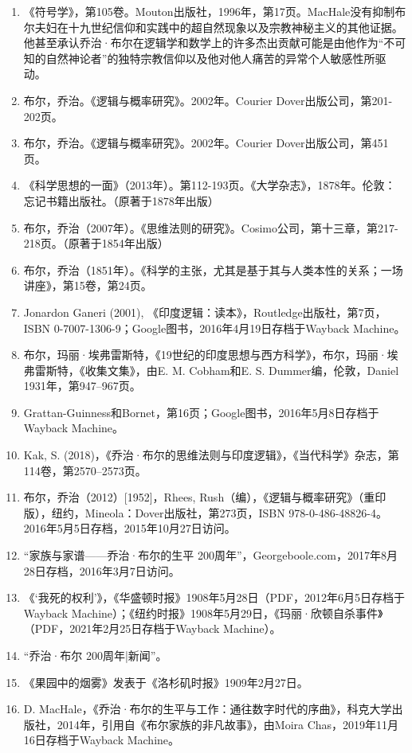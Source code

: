 \begin{enumerate}
\item 《符号学》，第105卷。Mouton出版社，1996年，第17页。MacHale没有抑制布尔夫妇在十九世纪信仰和实践中的超自然现象以及宗教神秘主义的其他证据。他甚至承认乔治·布尔在逻辑学和数学上的许多杰出贡献可能是由他作为“不可知的自然神论者”的独特宗教信仰以及他对他人痛苦的异常个人敏感性所驱动。
\item 布尔，乔治。《逻辑与概率研究》。2002年。Courier Dover出版公司，第201-202页。
\item 布尔，乔治。《逻辑与概率研究》。2002年。Courier Dover出版公司，第451页。
\item 《科学思想的一面》（2013年）。第112-193页。《大学杂志》，1878年。伦敦：忘记书籍出版社。（原著于1878年出版）
\item 布尔，乔治（2007年）。《思维法则的研究》。Cosimo公司，第十三章，第217-218页。（原著于1854年出版）
\item 布尔，乔治（1851年）。《科学的主张，尤其是基于其与人类本性的关系；一场讲座》，第15卷，第24页。
\item Jonardon Ganeri (2001), 《印度逻辑：读本》，Routledge出版社，第7页，ISBN 0-7007-1306-9；Google图书，2016年4月19日存档于Wayback Machine。
\item 布尔，玛丽·埃弗雷斯特，《19世纪的印度思想与西方科学》，布尔，玛丽·埃弗雷斯特，《收集文集》，由E. M. Cobham和E. S. Dummer编，伦敦，Daniel 1931年，第947–967页。
\item Grattan-Guinness和Bornet，第16页；Google图书，2016年5月8日存档于Wayback Machine。
\item Kak, S. (2018)，《乔治·布尔的思维法则与印度逻辑》，《当代科学》杂志，第114卷，第2570–2573页。
\item 布尔，乔治（2012）[1952]，Rhees, Rush（编），《逻辑与概率研究》（重印版），纽约，Mineola：Dover出版社，第273页，ISBN 978-0-486-48826-4。2016年5月5日存档，2015年10月27日访问。
\item “家族与家谱——乔治·布尔的生平 200周年”，Georgeboole.com，2017年8月28日存档，2016年3月7日访问。
\item 《‘我死的权利’》，《华盛顿时报》1908年5月28日（PDF，2012年6月5日存档于Wayback Machine）；《纽约时报》1908年5月29日，《玛丽·欣顿自杀事件》（PDF，2021年2月25日存档于Wayback Machine）。
\item “乔治·布尔 200周年|新闻”。
\item 《果园中的烟雾》发表于《洛杉矶时报》1909年2月27日。
\item D. MacHale，《乔治·布尔的生平与工作：通往数字时代的序曲》，科克大学出版社，2014年，引用自《布尔家族的非凡故事》，由Moira Chas，2019年11月16日存档于Wayback Machine。
\end{enumerate}
